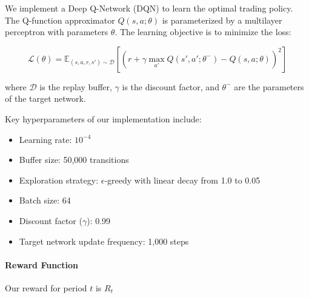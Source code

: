 \documentclass[12pt,a4paper]{article}
\begin{document}
We implement a Deep Q-Network (DQN) to learn the optimal trading policy. The Q-function approximator $Q(s, a; \theta)$ is parameterized by a multilayer perceptron with parameters $\theta$. The learning objective is to minimize the loss:

$$\mathcal{L}(\theta) = \mathbb{E}_{(s, a, r, s') \sim \mathcal{D}} \left[ \left( r + \gamma \max_{a'} Q(s', a'; \theta^-) - Q(s, a; \theta) \right)^2 \right]$$

where $\mathcal{D}$ is the replay buffer, $\gamma$ is the discount factor, and $\theta^-$ are the parameters of the target network.

Key hyperparameters of our implementation include:

\begin{itemize}[font=\normalfont\color{black}, %
				  leftmargin=0pt, %
				  align=right, %
				  labelwidth=0cm,
				  labelsep=0.2cm,
				  itemsep=0pt,
				  topsep=0pt]
  \item Learning rate: $10^{-4}$
  \item Buffer size: 50,000 transitions
  \item Exploration strategy: $\epsilon$-greedy with linear decay from 1.0 to 0.05
  \item Batch size: 64
  \item Discount factor ($\gamma$): 0.99
  \item Target network update frequency: 1,000 steps
\end{itemize}

\paragraph{Reward Function}

Our reward for period $t$ is $R_t$

%
%
%
%
%
\end{document}
